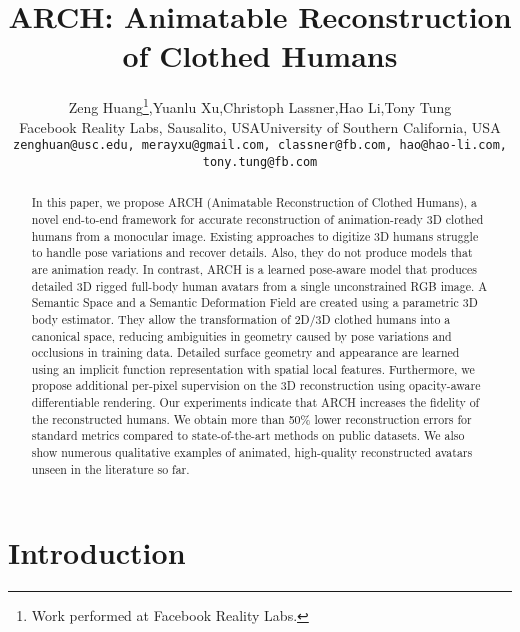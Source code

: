 \documentclass[10pt,twocolumn,letterpaper]{article}
\newcommand{\beforesection}{\vspace{-1mm}}
\newcommand{\aftersection}{\vspace{-1mm}}
\begin{document}
\title{ARCH: Animatable Reconstruction of Clothed Humans}


\author{Zeng Huang\thanks{Work performed at Facebook Reality Labs.},\quad Yuanlu Xu,\quad Christoph Lassner,\quad Hao Li,\quad Tony Tung\\
Facebook Reality Labs, Sausalito, USA\quad\quad University of Southern California, USA\\
{\tt\small zenghuan@usc.edu, merayxu@gmail.com, classner@fb.com, hao@hao-li.com, tony.tung@fb.com}
}

\maketitle




\begin{abstract}In this paper, we propose ARCH (Animatable Reconstruction of Clothed Humans), a novel end-to-end framework for accurate reconstruction of animation-ready 3D clothed humans from a monocular image.
Existing approaches to digitize 3D humans struggle to handle pose variations and recover details.
Also, they do not produce models that are animation ready.
In contrast, ARCH is a learned pose-aware model that produces detailed 3D rigged full-body human avatars from a single unconstrained RGB image.
A Semantic Space and a Semantic Deformation Field are created using a parametric 3D body estimator. They allow the transformation of 2D/3D clothed humans into a canonical space, reducing ambiguities in geometry caused by pose variations and occlusions in training data.
Detailed surface geometry and appearance are learned using an implicit function representation with spatial local features.
Furthermore, we propose additional per-pixel supervision on the 3D reconstruction using opacity-aware differentiable rendering.
Our experiments indicate that ARCH increases the fidelity of the reconstructed humans. We obtain more than 50\% lower reconstruction errors for standard metrics compared to state-of-the-art methods on public datasets. We also show numerous qualitative examples of animated, high-quality reconstructed avatars unseen in the literature so far.




\end{abstract}

\beforesection
\section{Introduction} \label{sec:intro}
\aftersection
\end{document}
